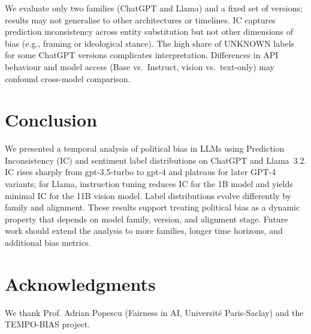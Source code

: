 \documentclass[11pt]{article}
\begin{document}
We evaluate only two families (ChatGPT and Llama) and a fixed set of versions; results may not generalise to other architectures or timelines. IC captures prediction inconsistency across entity substitution but not other dimensions of bias (e.g., framing or ideological stance). The high share of UNKNOWN labels for some ChatGPT versions complicates interpretation. Differences in API behaviour and model access (Base vs.\ Instruct, vision vs.\ text-only) may confound cross-model comparison.

\section{Conclusion}

We presented a temporal analysis of political bias in LLMs using Prediction Inconsistency (IC) and sentiment label distributions on ChatGPT and Llama~3.2. IC rises sharply from gpt-3.5-turbo to gpt-4 and plateaus for later GPT-4 variants; for Llama, instruction tuning reduces IC for the 1B model and yields minimal IC for the 11B vision model. Label distributions evolve differently by family and alignment. These results support treating political bias as a dynamic property that depends on model family, version, and alignment stage. Future work should extend the analysis to more families, longer time horizons, and additional bias metrics.

\section*{Acknowledgments}
We thank Prof. Adrian Popescu (Fairness in AI, Université Paris-Saclay) and the TEMPO-BIAS project.


\end{document}
